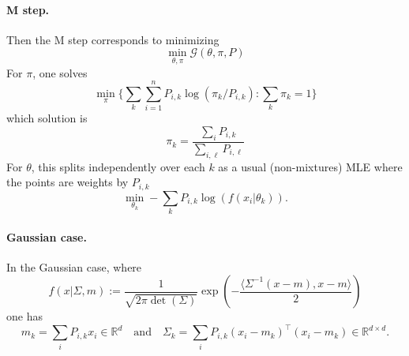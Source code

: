 \documentclass{article}
\begin{document}
\paragraph{M step.}

Then the M step corresponds to minimizing 
$$
	\min_{\theta,\pi} \mathcal{G}(\theta,\pi,P) 
$$
For $\pi$, one solves 
$$
	\min_\pi \{  \sum_k \sum_{i=1}^n P_{i,k} \log(\pi_k / P_{i,k})  : \sum_k \pi_k = 1\}
$$
which solution is
$$
	\pi_k = \frac{\sum_i P_{i,k}}{ \sum_{i,\ell} P_{i,\ell} }
$$
For $\theta$, this splits independently over each $k$ as a usual (non-mixtures) MLE where the points are weights by $P_{i,k}$
$$
	\min_{\theta_k} -\sum_k P_{i,k} \log( f(x_i|\theta_k) ).
$$

\paragraph{Gaussian case.}

In the Gaussian case, where
$$
	f(x|\Sigma,m) := \frac{1}{\sqrt{2\pi\det(\Sigma)}} \exp\left(-\frac{ \langle \Sigma^{-1}(x-m),x-m \rangle }{2} \right)
$$
one has
$$
	m_k = \sum_i P_{i,k} x_i  \in \mathbb{R}^{d}
		\quad\text{and}\quad 
	\Sigma_k = \sum_i P_{i,k} (x_i-m_k)^\top  (x_i-m_k) \in \mathbb{R}^{d \times d}. 
$$
\end{document}
